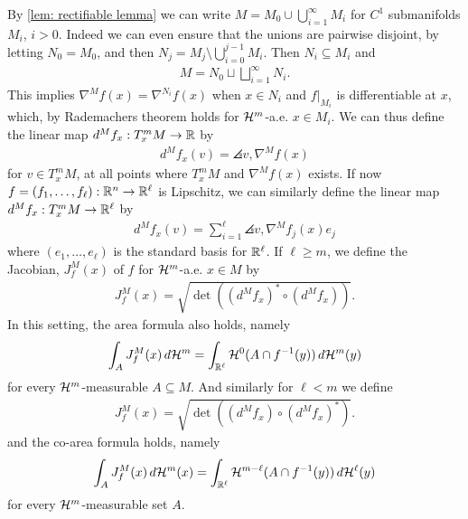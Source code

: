 By \cref{lem: rectifiable lemma} we can write $M=M_0 \cup \bigcup_{i=1}^{\infty}M_i$ for $C^1$ submanifolds $M_i$, $i > 0$. Indeed we can even ensure that the unions are pairwise disjoint, by letting $N_0=M_0$, and then $N_j=M_j \setminus \bigcup_{i=0}^{j-1}M_i$. Then $N_i \subseteq M_i$ and
\begin{align*}
    M=N_0 \sqcup \bigsqcup_{i=1}^{\infty}N_i.
\end{align*}
This implies $\nabla^Mf(x)=\nabla^{N_i}f(x)$ when $x \in N_i$ and $f|_{M_i}$ is differentiable at $x$, which, by Rademachers theorem holds for $\mathcal{H}^m$-a.e. $x \in M_i$. We can thus define the linear map $d^Mf_x:T_x^mM \to \mathbb{R}$ by
\begin{align*}
    d^Mf_x(v) = \angles{v,\nabla^Mf(x)}
\end{align*}
for $v \in T_x^mM$, at all points where $T_x^mM$ and $\nabla^Mf(x)$ exists. If now $f=(f_1, \dots, f_{\ell}):\mathbb{R}^n \to \mathbb{R}^{\ell}$ is Lipschitz, we can similarly define the linear map $d^Mf_x:T_x^mM \to \mathbb{R}^{\ell}$ by
\begin{align*}
    d^Mf_x(v) = \sum_{i=1}^{\ell} \angles{v, \nabla^Mf_j(x)}e_j
\end{align*}
where $(e_1, \dots, e_{\ell})$ is the standard basis for $\mathbb{R}^{\ell}$. If $\ell \ge m$, we define the Jacobian, $J_f^M(x)$ of $f$ for $\mathcal{H}^m$-a.e. $x \in M$ by
\begin{align*}
    J^M_f(x) = \sqrt{\det((d^Mf_x)^* \circ (d^Mf_x))}.
\end{align*}
In this setting, the area formula also holds, namely
\begin{align*}
    \int_A J_f^M(x) \, d\mathcal{H}^m = \int_{\mathbb{R}^{\ell}} \mathcal{H}^0(A \cap f^{-1}(y)) \, d\mathcal{H}^m(y)
\end{align*}
for every $\mathcal{H}^m$-measurable $A \subseteq M$. And similarly for $\ell<m$  we define
\begin{align*}
    J^M_f(x) = \sqrt{\det((d^Mf_x) \circ (d^Mf_x)^*)}.
\end{align*}
and the co-area formula holds, namely
\begin{align*}
    \int_A J_f^M(x) \, d\mathcal{H}^m(x) = \int_{\mathbb{R}^{\ell}} \mathcal{H}^{m-\ell}(A \cap f^{-1}(y)) \, d\mathcal{H}^{\ell}(y)
\end{align*}
for every $\mathcal{H}^m$-measurable set $A$.

